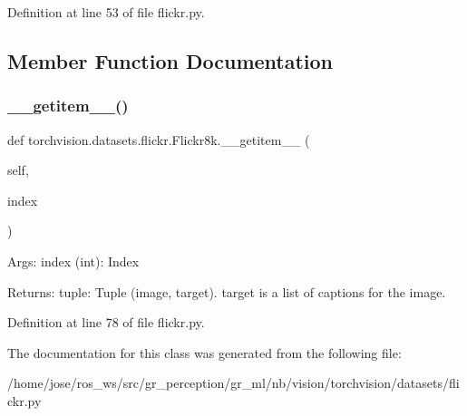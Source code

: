 Definition at line 53 of file flickr.\+py.



\subsection{Member Function Documentation}
\mbox{\label{classtorchvision_1_1datasets_1_1flickr_1_1Flickr8k_ac31ef7d7be4520be6b318dfd65c91e0d}} 
\subsubsection{\texorpdfstring{\+\_\+\+\_\+getitem\+\_\+\+\_\+()}{\_\_getitem\_\_()}}
{\footnotesize\ttfamily def torchvision.\+datasets.\+flickr.\+Flickr8k.\+\_\+\+\_\+getitem\+\_\+\+\_\+ (\begin{DoxyParamCaption}\item[{}]{self,  }\item[{}]{index }\end{DoxyParamCaption})}

\begin{DoxyVerb}Args:
    index (int): Index

Returns:
    tuple: Tuple (image, target). target is a list of captions for the image.
\end{DoxyVerb}
 

Definition at line 78 of file flickr.\+py.



The documentation for this class was generated from the following file\+:\begin{DoxyCompactItemize}
\item 
/home/jose/ros\+\_\+ws/src/gr\+\_\+perception/gr\+\_\+ml/nb/vision/torchvision/datasets/flickr.\+py\end{DoxyCompactItemize}
